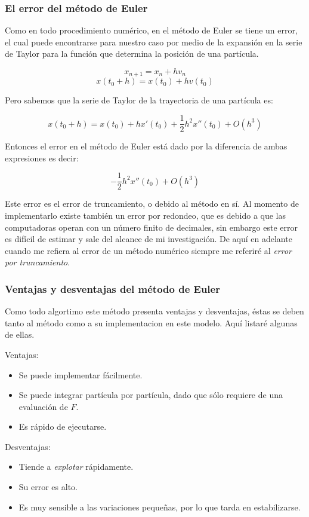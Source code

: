 \subsubsection{El error del método de Euler}
Como en todo procedimiento numérico, en el método de Euler se tiene un error, el cual puede encontrarse para nuestro caso por medio de la expansión en la serie de Taylor para la función que determina la posición de una partícula.

$$x_{n+1}  =  x_n + hv_n$$
$$x(t_0 + h) = x(t_0) + h v(t_0)$$

Pero sabemos que la serie de Taylor de la trayectoria de una partícula es:

$$x(t_0 + h) = x(t_0) + h x'(t_0) + \frac{1}{2}h^2x''(t_0) + O(h^3)$$

Entonces el error en el método de Euler está dado por la diferencia de ambas expresiones es decir:

$$-\frac{1}{2}h^2x''(t_0) + O(h^3)$$

Este error es el error de truncamiento, o debido al método en sí. Al momento de implementarlo existe también un error por redondeo, que es debido a que las computadoras operan con un número finito de decimales, sin embargo este error es difícil de estimar y sale del alcance de mi investigación. De aquí en adelante cuando me refiera al error de un método numérico siempre me referiré al \emph{error por truncamiento}.

\subsubsection{Ventajas y desventajas del método de Euler}

Como todo algortimo este método presenta ventajas y desventajas, éstas se deben tanto al método como a su implementacion en este modelo. Aquí listaré algunas de ellas.

Ventajas:
\begin{itemize}
\item Se puede implementar fácilmente.
\item Se puede integrar partícula por partícula, dado que sólo requiere de una evaluación de $F$.
\item Es rápido de ejecutarse.
\end{itemize}

Desventajas:
\begin{itemize}
\item Tiende a \emph{explotar} rápidamente.
\item Su error es alto.
\item Es muy sensible a las variaciones pequeñas, por lo que tarda en estabilizarse.
\end{itemize}

